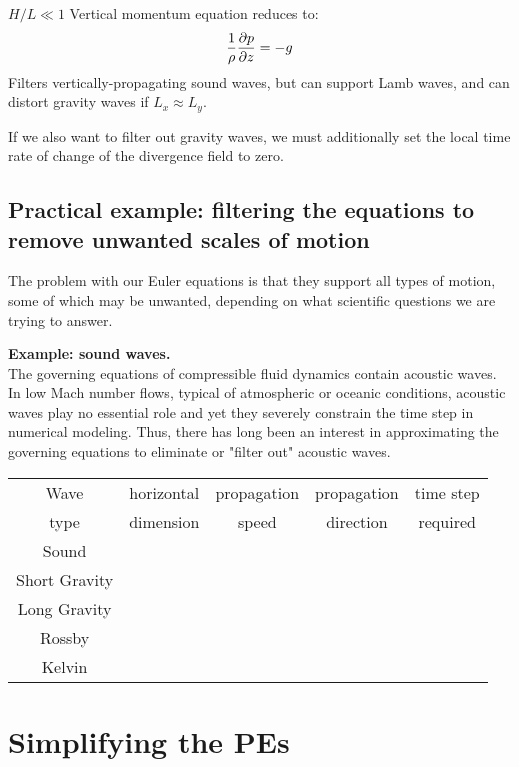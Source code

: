 \begin{definition}
{\bf $H/L \ll 1$} Vertical momentum equation reduces to:
\begin{equation}
	\frac{1}{\rho}\frac{\partial p}{\partial z}=-g
	\label{hydrostatic}
\end{equation}
Filters vertically-propagating sound waves, but can support Lamb waves, and can distort gravity waves if $L_x \approx L_y$.

If we also want to filter out gravity waves, we must additionally set the local time rate of change of the divergence field to zero.
\end{definition}


\subsection{Practical example: filtering the equations to remove unwanted scales of motion} 

The problem with our Euler equations is that they support all types of motion, some of which may be unwanted, depending on what scientific questions we are trying to answer. 

\medskip

{\bf Example: sound waves.}\\
The governing equations of compressible fluid dynamics contain acoustic waves. In low Mach number flows, typical of atmospheric or oceanic conditions, acoustic waves play no essential role and yet they severely constrain the time step in numerical modeling. Thus, there has long been an interest in approximating the governing equations to eliminate or "filter out" acoustic waves. 

\medskip

\begin{tabular}{|c|c|c|c|c|}
	\hline
	Wave & horizontal & propagation & propagation  & time step \\
	type & dimension & speed & direction & required \\
	\hline
	Sound &  &  &  & \\
	\hline
	Short Gravity &  &  &  & \\
	\hline
	Long Gravity &  &  &  & \\
	\hline
	Rossby &  &  & & \\
	\hline
	Kelvin &  &  &  & \\
	\hline
\end{tabular}

\section{Simplifying the PEs}
